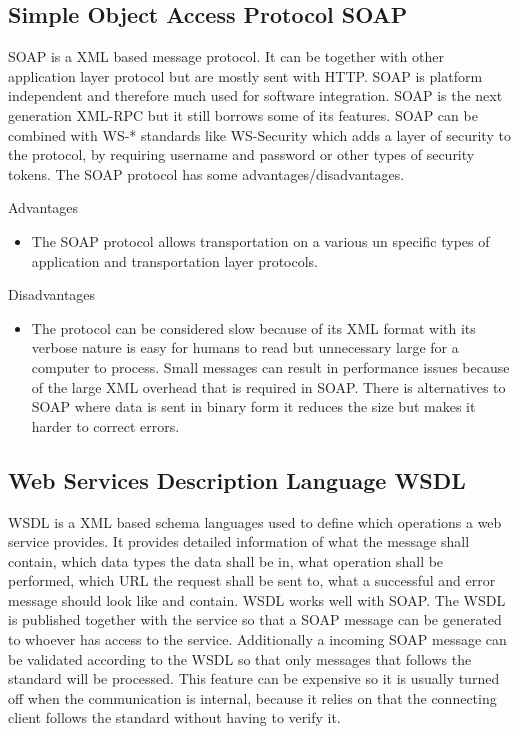 \documentclass{llncs}
\begin{document}
\subsection{Simple Object Access Protocol SOAP}
SOAP is a XML based message protocol. It can be together with other application layer protocol but are mostly sent with HTTP. SOAP is platform independent and therefore much used for software  integration. SOAP is the next generation XML-RPC but it still borrows some of its features. SOAP can be combined with WS-* standards like WS-Security which adds a layer of security to the protocol, by requiring username and password or other types of security tokens. The SOAP protocol has some advantages/disadvantages.

Advantages
\begin{itemize}
\item The SOAP protocol allows transportation on a various un specific types of application and transportation layer protocols.
\end{itemize}
Disadvantages
\begin{itemize}
\item The protocol can be considered slow because of its XML format with its verbose nature is easy for humans to read but unnecessary large for a computer to process. Small messages can result in performance issues because of the large XML overhead that is required in SOAP. There is alternatives to SOAP where data is sent in binary form it reduces the size but makes it harder to correct errors.
\end{itemize}


\subsection{Web Services Description Language WSDL}
WSDL is a XML based schema languages used to define which operations a web service provides. It provides detailed information of what the message shall contain, which data types the data shall be in, what operation shall be performed, which URL the request shall be sent to, what a successful and error message should look like and contain. WSDL works well with SOAP. The WSDL is published together with the service so that a SOAP message can be generated to whoever has access to the service. Additionally a incoming SOAP message can be validated according to the WSDL so that only messages that follows the standard will be processed. This feature can be expensive so it is usually turned off when the communication is internal, because it relies on that the connecting client follows the standard without having to verify it.
\end{document}
